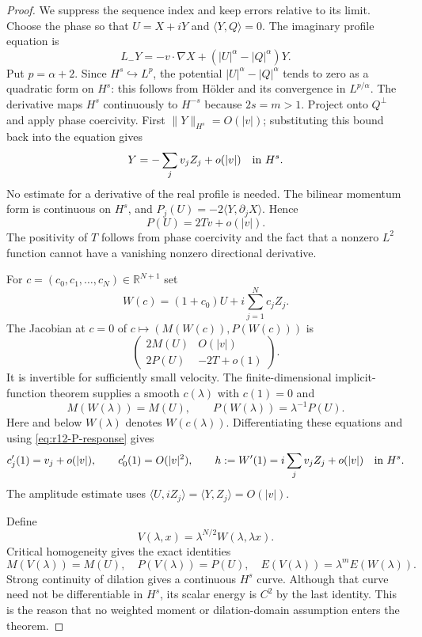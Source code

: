 \begin{proof}
We suppress the sequence index and keep errors relative to its limit.
Choose the phase so that $U=X+iY$ and $\langle Y,Q\rangle=0$.
The imaginary profile equation is
\[
 L_-Y=-v\cdot\nabla X+(|U|^\alpha-|Q|^\alpha)Y.
\]
Put $p=\alpha+2$. Since $H^s\hookrightarrow L^p$, the potential
$|U|^\alpha-|Q|^\alpha$ tends to zero as a quadratic form on $H^s$:
this follows from H\"older and its convergence in $L^{p/\alpha}$.
The derivative maps $H^s$ continuously to $H^{-s}$ because $2s=m>1$.
Project onto $Q^\perp$ and apply phase coercivity. First
$\|Y\|_{H^s}=O(|v|)$; substituting this bound back into the equation gives
\begin{equation}\label{eq:r12-imaginary-response}
 Y=-\sum_jv_jZ_j+o(|v|)\quad\hbox{in }H^s.
\end{equation}
No estimate for a derivative of the real profile is needed.
The bilinear momentum form is continuous on $H^s$, and
$P_j(U)=-2\langle Y,\partial_jX\rangle$. Hence
\begin{equation}\label{eq:r12-P-response}
 P(U)=2Tv+o(|v|).
\end{equation}
The positivity of $T$ follows from phase coercivity and the fact that a
nonzero $L^2$ function cannot have a vanishing nonzero directional
derivative.

For $c=(c_0,c_1,\ldots,c_N)\in\mathbb R^{N+1}$ set
\[
 W(c)=(1+c_0)U+i\sum_{j=1}^N c_jZ_j.
\]
The Jacobian at $c=0$ of $c\mapsto(M(W(c)),P(W(c)))$ is
\[
 \begin{pmatrix}
  2M(U)&O(|v|)\\
  2P(U)&-2T+o(1)
 \end{pmatrix}.
\]
It is invertible for sufficiently small velocity. The finite-dimensional
implicit-function theorem supplies a smooth $c(\lambda)$ with $c(1)=0$
and
\begin{equation}\label{eq:r12-W-charges}
 M(W(\lambda))=M(U),\qquad
 P(W(\lambda))=\lambda^{-1}P(U).
\end{equation}
Here and below $W(\lambda)$ denotes $W(c(\lambda))$.
Differentiating these equations and using
\eqref{eq:r12-P-response} gives
\[
 c_j'(1)=v_j+o(|v|),\qquad c_0'(1)=O(|v|^2),
 \qquad h:=W'(1)=i\sum_jv_jZ_j+o(|v|)\quad\hbox{in }H^s.
\]
The amplitude estimate uses
$\langle U,iZ_j\rangle=\langle Y,Z_j\rangle=O(|v|)$.

Define
\[
 V(\lambda,x)=\lambda^{N/2}W(\lambda,\lambda x).
\]
Critical homogeneity gives the exact identities
\begin{equation}\label{eq:r12-scaled-charges}
 M(V(\lambda))=M(U),\quad P(V(\lambda))=P(U),\quad
 E(V(\lambda))=\lambda^mE(W(\lambda)).
\end{equation}
Strong continuity of dilation gives a continuous $H^s$ curve. Although
that curve need not be differentiable in $H^s$, its scalar energy is
$C^2$ by the last identity. This is the reason that no weighted moment
or dilation-domain assumption enters the theorem.


\end{proof}
